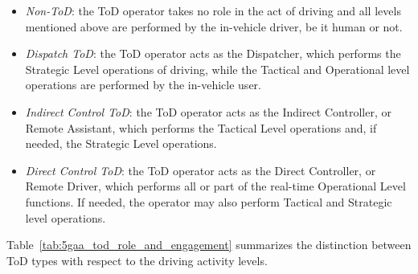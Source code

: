 \begin{itemize}
    \item \textit{Non-ToD}: the ToD operator takes no role in the act of driving and all levels mentioned above are performed by the in-vehicle driver, be it human or not.
    \item \textit{Dispatch ToD}: the ToD operator acts as the Dispatcher, which performs the Strategic Level operations of driving, while the Tactical and Operational level operations are performed by the in-vehicle user.
    \item \textit{Indirect Control ToD}: the ToD operator acts as the Indirect Controller, or Remote Assistant, which performs the Tactical Level operations and, if needed, the Strategic Level operations.
    \item \textit{Direct Control ToD}: the ToD operator acts as the Direct Controller, or Remote Driver, which performs all or part of the real-time Operational Level functions. If needed, the operator may also perform Tactical and Strategic level operations.
\end{itemize}

Table~\ref{tab:5gaa_tod_role_and_engagement} summarizes the distinction between ToD types with respect to the driving activity levels.


